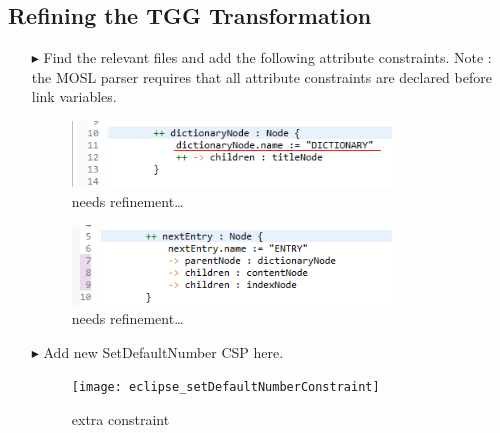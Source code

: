 \newpage
\hypertarget{m2ttex}{}
\subsection{Refining the TGG Transformation}
\texHeader

\begin{itemize}

\item[$\blacktriangleright$] Find the relevant files and add the following attribute constraints. Note : the MOSL parser requires that all attribute constraints
are declared before link variables.

\begin{figure}[htp]
\begin{center}
  \includegraphics[width=0.8\textwidth]{eclipse_NodeToDictionaryRule_updated}
  \caption[labelInTOC]{needs refinement\ldots}
  \label{eclipse:generatedBkwrdMdl}
\end{center}
\end{figure}

\begin{figure}[htp]
\begin{center}
  \includegraphics[width=0.8\textwidth]{eclipse_ForAllEntryRule_updated}
  \caption[labelInTOC]{needs refinement\ldots}
  \label{eclipse:generatedBkwrdMdl}
\end{center}
\end{figure} 

\item[$\blacktriangleright$] Add new SetDefaultNumber CSP here.

\begin{figure}[htbp]
\begin{center}
  \texttt{[image: eclipse\_setDefaultNumberConstraint]}
  \caption{extra constraint}
  \label{eclipse:newEntryConstraint}
\end{center}
\end{figure}

\end{itemize}
